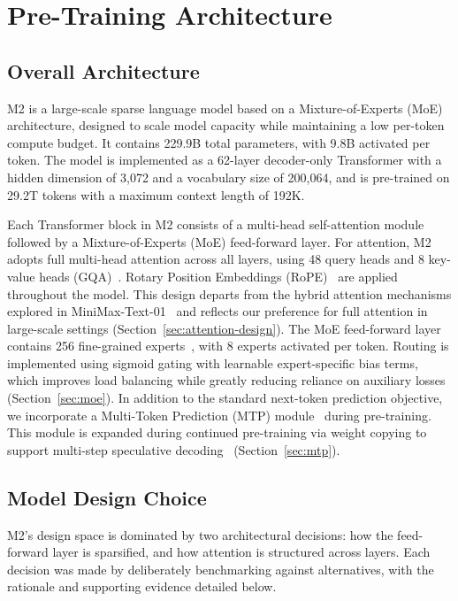\section{Pre-Training Architecture}

\subsection{Overall Architecture}

M2 is a large-scale sparse language model based on a Mixture-of-Experts (MoE) architecture, designed to scale model capacity while maintaining a low per-token compute budget. It contains 229.9B total parameters, with 9.8B activated per token. The model is implemented as a 62-layer decoder-only Transformer with a hidden dimension of 3{,}072 and a vocabulary size of 200{,}064, and is pre-trained on 29.2T tokens with a maximum context length of 192K.

Each Transformer block in M2 consists of a multi-head self-attention module followed by a Mixture-of-Experts (MoE) feed-forward layer. For attention, M2 adopts full multi-head attention across all layers, using 48 query heads and 8 key-value heads (GQA)~\citep{ainslie2023gqa}. Rotary Position Embeddings (RoPE)~\citep{su2024roformer} are applied throughout the model. This design departs from the hybrid attention mechanisms explored in MiniMax-Text-01~\citep{minimax2025minimax01} and reflects our preference for full attention in large-scale settings (Section~\ref{sec:attention-design}). The MoE feed-forward layer contains 256 fine-grained experts~\citep{dai2024deepseekmoe}, with 8 experts activated per token. Routing is implemented using sigmoid gating with learnable expert-specific bias terms, which improves load balancing while greatly reducing reliance on auxiliary losses~\citep{wang2024auxfree} (Section~\ref{sec:moe}). In addition to the standard next-token prediction objective, we incorporate a Multi-Token Prediction (MTP) module~\citep{gloeckle2024better} during pre-training. This module is expanded during continued pre-training via weight copying to support multi-step speculative decoding~\citep{leviathan2023fast} (Section~\ref{sec:mtp}).

\subsection{Model Design Choice}
\label{sec:design-choice}

M2's design space is dominated by two architectural decisions: how the feed-forward layer is sparsified, and how attention is structured across layers. Each decision was made by deliberately benchmarking against alternatives, with the rationale and supporting evidence detailed below.

